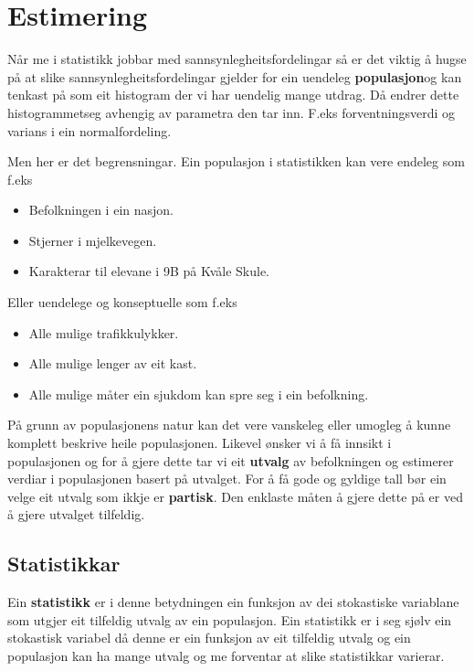 \chapter{Estimering}
Når me i statistikk jobbar med sannsynlegheitsfordelingar så er det viktig å hugse på at slike sannsynlegheitsfordelingar gjelder for ein uendeleg \startsitat\textbf{populasjon}\sluttsitat og kan tenkast på som eit histogram der vi har uendelig mange utdrag. Då endrer dette \startsitat histogrammet\sluttsitat seg avhengig av parametra den tar inn. F.eks forventningsverdi og varians i ein normalfordeling.

Men her er det begrensningar. Ein populasjon i statistikken kan vere endeleg som f.eks 
\begin{itemize}
    \item Befolkningen i ein nasjon.
    \item Stjerner i mjelkevegen.
    \item Karakterar til elevane i 9B på Kvåle Skule.
\end{itemize}
Eller uendelege og konseptuelle som f.eks
\begin{itemize}
    \item Alle mulige trafikkulykker.
    \item Alle mulige lenger av eit kast.
    \item Alle mulige måter ein sjukdom kan spre seg i ein befolkning.
\end{itemize}

På grunn av populasjonens natur kan det vere vanskeleg eller umogleg å kunne komplett beskrive heile populasjonen. Likevel ønsker vi å få innsikt i populasjonen og for å gjere dette tar vi eit \textbf{utvalg} av befolkningen og estimerer verdiar i populasjonen basert på utvalget. For å få gode og gyldige tall bør ein velge eit utvalg som ikkje er \textbf{partisk}. Den enklaste måten å gjere dette på er ved å gjere utvalget tilfeldig.

\section{Statistikkar}\label{chap:statistikk}
Ein \textbf{statistikk} er i denne betydningen ein \startsitat funksjon av dei stokastiske variablane som utgjer eit tilfeldig utvalg av ein populasjon\sluttsitat. Ein statistikk er i seg sjølv ein stokastisk variabel då denne er ein funksjon av eit tilfeldig utvalg og ein populasjon kan ha mange utvalg og me forventar at slike statistikkar varierar. 

